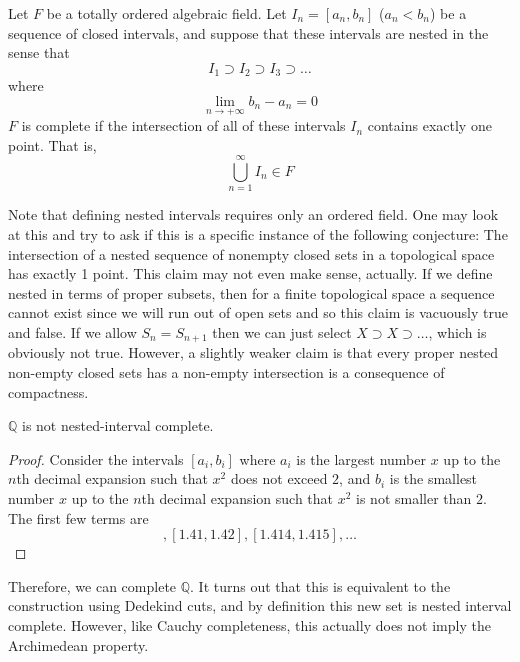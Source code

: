     \begin{definition}
      Let $F$ be a totally ordered algebraic field. Let $I_n= [a_n, b_n]$ ($a_n < b_n$) be a sequence of closed intervals, and suppose that these intervals are nested in the sense that
      \[I_1 \supset I_2 \supset I_3 \supset \ldots\]
      where 
      \[\lim_{n \rightarrow + \infty} b_n - a_n = 0\]
      $F$ is complete if the intersection of all of these intervals $I_n$ contains exactly one point. That is, 
      \[\bigcup_{n=1}^\infty I_n \in F\]
    \end{definition}

    Note that defining nested intervals requires only an ordered field. One may look at this and try to ask if this is a specific instance of the following conjecture: The intersection of a nested sequence of nonempty closed sets in a topological space has exactly 1 point. This claim may not even make sense, actually. If we define nested in terms of proper subsets, then for a finite topological space a sequence cannot exist since we will run out of open sets and so this claim is vacuously true and false. If we allow $S_n = S_{n+1}$ then we can just select $X \supset X \supset \ldots$, which is obviously not true. However, a slightly weaker claim is that every proper nested non-empty closed sets has a non-empty intersection is a consequence of compactness. 

    \begin{theorem}
      $\mathbb{Q}$ is not nested-interval complete. 
    \end{theorem}
    \begin{proof}
      Consider the intervals $[a_i, b_i]$ where $a_i$ is the largest number $x$ up to the $n$th decimal expansion such that $x^2$ does not exceed $2$, and $b_i$ is the smallest number $x$ up to the $n$th decimal expansion such that $x^2$ is not smaller than $2$. The first few terms are 
      \begin{equation}
        [1.4, 1.5], [1.41, 1.42], [1.414, 1.415], \ldots
      \end{equation}
    \end{proof}

    Therefore, we can complete $\mathbb{Q}$. It turns out that this is equivalent to the construction using Dedekind cuts, and by definition this new set is nested interval complete. However, like Cauchy completeness, this actually does not imply the Archimedean property. 

